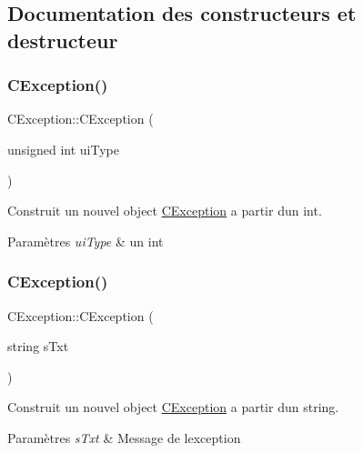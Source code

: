 \subsection{Documentation des constructeurs et destructeur}
\mbox{\label{classCException_a84f4e7fa075fdd466c5b203048205a6b}} 
\subsubsection{\texorpdfstring{C\+Exception()}{CException()}\hspace{0.1cm}{\footnotesize\ttfamily [1/2]}}
{\footnotesize\ttfamily C\+Exception\+::\+C\+Exception (\begin{DoxyParamCaption}\item[{unsigned int}]{ui\+Type }\end{DoxyParamCaption})}



Construit un nouvel object \hyperlink{classCException}{C\+Exception} a partir d\textquotesingle{}un int. 


\begin{DoxyParams}{Paramètres}
{\em ui\+Type} & un int \\
\hline
\end{DoxyParams}
\mbox{\label{classCException_aab8f2fdcdc5e4390e66a32c8706b9df8}} 
\subsubsection{\texorpdfstring{C\+Exception()}{CException()}\hspace{0.1cm}{\footnotesize\ttfamily [2/2]}}
{\footnotesize\ttfamily C\+Exception\+::\+C\+Exception (\begin{DoxyParamCaption}\item[{string}]{s\+Txt }\end{DoxyParamCaption})}



Construit un nouvel object \hyperlink{classCException}{C\+Exception} a partir d\textquotesingle{}un string. 


\begin{DoxyParams}{Paramètres}
{\em s\+Txt} & Message de l\textquotesingle{}exception \\
\hline
\end{DoxyParams}


